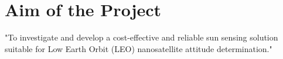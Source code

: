 \section{Aim of the Project}
"To investigate and develop a cost-effective and reliable sun sensing solution suitable for Low Earth Orbit (LEO) nanosatellite attitude determination."